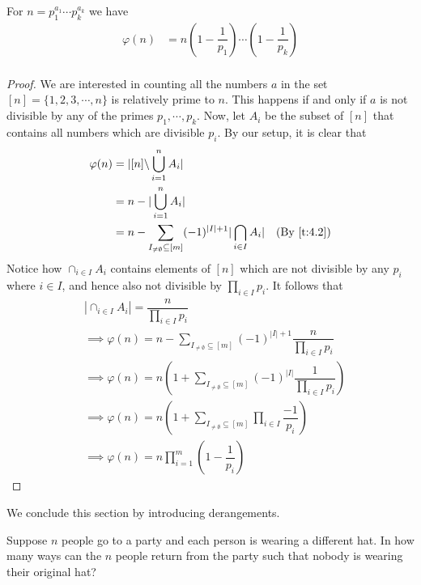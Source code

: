 \begin{theorem}
For $n=p_1^{a_1}\cdots p_k^{a_k}$ we have 
\begin{align*}
\varphi(n) &= n\left(1-\dfrac{1}{p_1}\right)\cdots\left(1-\dfrac{1}{p_k}\right) \\
\end{align*}
\end{theorem}
\begin{proof}
We are interested in counting all the numbers $a$ in the set $[n]=\{1,2,3,\cdots,n\}$ is relatively prime to $n$. This happens if and only if $a$ is not divisible by any of the primes $p_1,\cdots,p_k$. Now, let $A_i$ be the subset of $[n]$ that contains all numbers which are divisible $p_i$. By our setup, it is clear that 
\begin{align*}
\varphi(n) &= |[n]\backslash \bigcup_{i=1}^{n}A_i| \\
&= n - |\bigcup_{i=1}^{n}A_i| \\
&= n - \sum_{I_{\neq \emptyset}\subseteq [m]}(-1)^{|I|+1}|\bigcap_{i\in I}A_i| \quad \text{(By \cref{t:4.2})}
\end{align*}
Notice how $\cap_{i\in I}A_i$ contains elements of $[n]$ which are not divisible by any $p_i$ where $i\in I$, and hence also not divisible by $\prod_{i\in I}p_i$. It follows that
\begin{align*}
&|\cap_{i\in I}A_i| = \dfrac{n}{\prod_{i\in I}p_i} \\
&\implies \varphi(n) = n - \sum_{I_{\neq \emptyset}\subseteq [m]}(-1)^{|I|+1}\dfrac{n}{\prod_{i\in I}p_i} \\
&\implies \varphi(n) = n\left(1+\sum_{I_{\neq\emptyset}\subseteq [m]}(-1)^{|I|}\dfrac{1}{\prod_{i\in I}p_i}\right) \\
&\implies \varphi(n) = n\left(1+\sum_{I_{\neq\emptyset}\subseteq [m]}\prod_{i\in I}\dfrac{-1}{p_i}\right) \\
&\implies \varphi(n) = n\prod_{i=1}^{m}\left(1-\dfrac{1}{p_i}\right)
\end{align*}

\end{proof}
We conclude this section by introducing derangements. 
\begin{question}
Suppose $n$ people go to a party and each person is wearing a different hat. In how many ways can the $n$ people return from the party such that nobody is wearing their original hat?    
\end{question}
